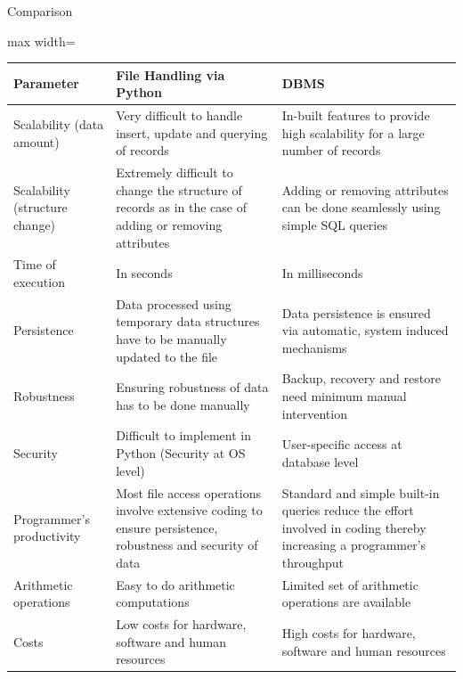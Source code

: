 \documentclass[aspectratio=169, xcolor=dvipsnames]{beamer}
\begin{document}
\begin{frame}{Comparison}
    \begin{center}
        \begin{adjustbox}{max width=\textwidth}
        \begin{tabular}{|l|p{6cm}|p{6cm}|}
        \hline
        \textbf{Parameter} & \textbf{File Handling via Python} & \textbf{DBMS} \\ \hline
        Scalability (data amount) & Very difficult to handle insert, update and querying of records & In-built features to provide high scalability for a large number of records \\ \hline
        Scalability (structure change) & Extremely difficult to change the structure of records as in the case of adding or removing attributes & Adding or removing attributes can be done seamlessly using simple SQL queries \\ \hline
        Time of execution & In seconds & In milliseconds \\ \hline
        Persistence & Data processed using temporary data structures have to be manually updated to the file & Data persistence is ensured via automatic, system induced mechanisms \\ \hline
        Robustness & Ensuring robustness of data has to be done manually & Backup, recovery and restore need minimum manual intervention \\ \hline
        Security & Difficult to implement in Python (Security at OS level) & User-specific access at database level \\ \hline
        Programmer's productivity & Most file access operations involve extensive coding to ensure persistence, robustness and security of data & Standard and simple built-in queries reduce the effort involved in coding thereby increasing a programmer's throughput \\ \hline
        Arithmetic operations & Easy to do arithmetic computations & Limited set of arithmetic operations are available \\ \hline
        Costs & Low costs for hardware, software and human resources & High costs for hardware, software and human resources \\ \hline
        \end{tabular}
        \end{adjustbox}
    \end{center}
\end{frame}
\end{document}
